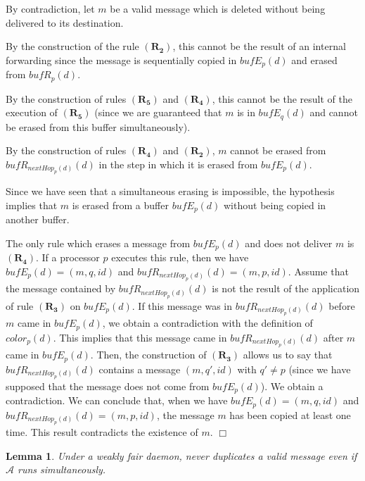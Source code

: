 \documentclass[11pt]{article}
\newtheorem{lemma}{Lemma}
\newenvironment{proof}{{\noindent\bf Proof. } }{{\hfill $\Box$}}
\begin{document}
\begin{proof}
By contradiction, let $m$ be a valid message which is deleted without being delivered to its destination.

By the construction of the rule $\boldsymbol{(R_{2})}$, this cannot be the result of an internal forwarding since the message is sequentially copied in $bufE_{p}(d)$ and erased from $bufR_{p}(d)$.

By the construction of rules $\boldsymbol{(R_{5})}$ and $\boldsymbol{(R_{4})}$, this cannot be the result of the execution of $\boldsymbol{(R_{5})}$ (since we are guaranteed that $m$ is in $bufE_{q}(d)$ and cannot be erased from this buffer simultaneously).

By the construction of rules $\boldsymbol{(R_{4})}$ and $\boldsymbol{(R_{2})}$, $m$ cannot be erased from $bufR_{nextHop_{p}(d)}(d)$ in the step in which it is erased from $bufE_{p}(d)$.

Since we have seen that a simultaneous erasing is impossible, the hypothesis implies that $m$ is erased from a buffer $bufE_{p}(d)$ without being copied in another buffer.

The only rule which erases a message from $bufE_{p}(d)$ and does not deliver $m$ is $\boldsymbol{(R_{4})}$. If a processor $p$ executes this rule, then we have $bufE_{p}(d)=(m,q,id)$ and $bufR_{nextHop_{p}(d)}(d)=(m,p,id)$. Assume that the message contained by $bufR_{nextHop_{p}(d)}(d)$ is not the result of the application of rule $\boldsymbol{(R_{3})}$ on $bufE_{p}(d)$. If this message was in $bufR_{nextHop_{p}(d)}(d)$ before $m$ came in $bufE_{p}(d)$, we obtain a contradiction with
the definition of $color_{p}(d)$. This implies that this message came in $bufR_{nextHop_{p}(d)}(d)$ after $m$ came in $bufE_{p}(d)$. Then, the construction of $\boldsymbol{(R_{3})}$ allows us to say that $bufR_{nextHop_{p}(d)}(d)$ contains a message $(m,q',id)$ with $q'\neq p$ (since we have supposed that the message does not come from $bufE_{p}(d)$). We obtain a contradiction. We can conclude that, when we have $bufE_{p}(d)=(m,q,id)$ and $bufR_{nextHop_{p}(d)}(d)=(m,p,id)$, the message $m$  has been copied at least one time. This result contradicts the existence of $m$.
\end{proof}

\begin{lemma} \label{lem:duplicationN}
Under a weakly fair daemon, \AN never duplicates a valid message even if $\mathcal{A}$ runs simultaneously.
\end{lemma}
\end{document}
